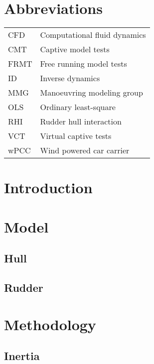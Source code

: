 \documentclass[preprint,9pt,authoryear]{elsarticle}
\begin{document}
\section*{Abbreviations}
\label{sec:introduction}
\begin{table}[h]
    \centering
    \scriptsize
    \label{tab:abbreviations}
    \begin{tabular}{l l}

    CFD & Computational fluid dynamics \\
    CMT & Captive model tests \\
    FRMT & Free running model tests \\
    ID & Inverse dynamics \\
    MMG & Manoeuvring modeling group \\
    OLS & Ordinary least-square \\
    RHI & Rudder hull interaction \\
    VCT & Virtual captive tests \\
    wPCC & Wind powered car carrier \\
    \end{tabular}
        
\end{table}
\FloatBarrier


\section{Introduction}
\label{sec:introduction}
\section{Model}

\subsection{Hull}

\subsection{Rudder}



\section{Methodology}
\subsection{Inertia}

%
\end{document}
